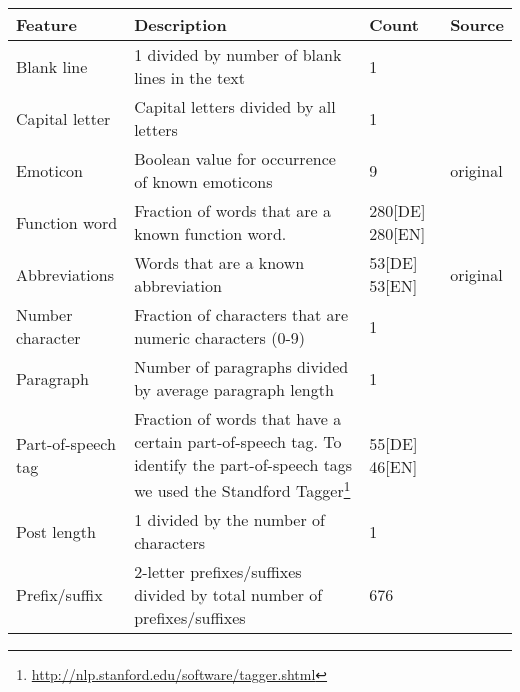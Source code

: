 \begin{savenotes}
\begin{table}[ht!]
    \begin{center}
    \begin{tabular}{p{2.6cm}|p{6cm}|p{1.2cm}|p{1.2cm}}
    Feature                 & Description                                                               & Count             & Source\\ \hline \hline
    Blank line               & 1 divided by number of blank lines in the text                            & 1                 & \cite{de2001mining}\\ \hline
    Capital letter           & Capital letters divided by all letters                                    & 1                 & \cite{argamon2003style} \cite{de2001mining}\\ \hline
    Emoticon                & Boolean value for occurrence of known emoticons                           & 9                 & original\\ \hline
    Function word            & Fraction of words that are a known function word.                         & 280[DE] 280[EN]   & \cite{argamon2003style} \cite{de2001mining} \cite{madigan2005author} \cite{narayanan2012feasibility}\\ \hline
    Abbreviations           & Words that are a known abbreviation                                       & 53[DE] 53[EN]     & original\\ \hline
    Number character         & Fraction of characters that are numeric characters (0-9)                  & 1                 & \cite{narayanan2012feasibility}\\ \hline
    Paragraph               & Number of paragraphs divided by average paragraph length                  & 1                 & \cite{argamon2003style}\\ \hline
    Part-of-speech tag      & Fraction of words that have a certain part-of-speech tag. To identify the part-of-speech tags we used the Standford Tagger\footnote{\url{http://nlp.stanford.edu/software/tagger.shtml}}
                                                                                                        & 55[DE] 46[EN]     & \cite{madigan2005author}\\ \hline
    Post length              & 1 divided by the number of characters                                     & 1                 & \cite{narayanan2012feasibility}\\ \hline
    Prefix/suffix            & 2-letter prefixes/suffixes divided by total number of prefixes/suffixes   & 676               & \cite{madigan2005author}\\ \hline

\end{tabular}
\end{center}
\end{table}
\end{savenotes}
